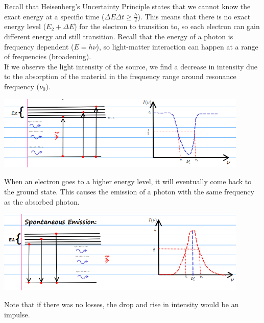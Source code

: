 \documentclass[11pt]{article}
\begin{document}
Recall that Heisenberg's Uncertainty Principle states that we cannot know the exact energy at a specific time ($\Delta E \Delta t \geq \frac{\hbar}{2}$). This means that there is no exact energy level ($E_2 + \Delta E$) for the electron to transition to, so each electron can gain different energy and still transition. Recall that the energy of a photon is frequency dependent ($E = h \nu$), so light-matter interaction can happen at a range of frequencies (broadening). 
\pagebreak
\\
If we observe the light intensity of the source, we find a decrease in intensity due to the absorption of the material in the frequency range around resonance frequency ($\nu_0$).
\begin{center}
    \includegraphics[width=0.9\textwidth]{6.png}
\end{center}
When an electron goes to a higher energy level, it will eventually come back to the ground state. This causes the emission of a photon with the same frequency as the absorbed photon.
\begin{center}
    \includegraphics[width=0.9\textwidth]{7.png}
\end{center}
Note that if there was no losses, the drop and rise in intensity would be an impulse.
\end{document}
